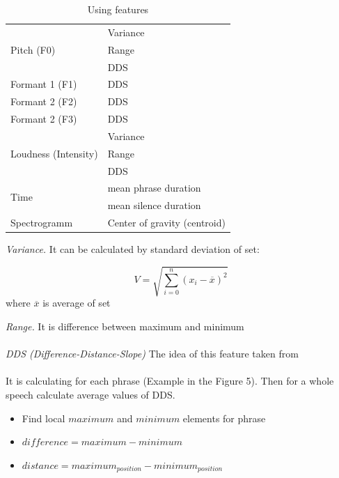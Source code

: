\documentclass[14pt]{extarticle}
\begin{document}
\begin{table}

\begin{tabular}{|p{2.2in}|p{2.2in}|} 
\hline
\multirow{3}{*}{Pitch (F0) }& Variance \\ \cline{2-2}
													& Range \\ \cline{2-2} 
													& DDS \\ \hline 
Formant 1 (F1) & DDS \\ \hline 
Formant 2 (F2) & DDS \\ \hline 
Formant 2 (F3) & DDS \\ \hline 
\multirow{3}{*}{Loudness (Intensity) } & Variance \\ \cline{2-2}
																		& Range \\ \cline{2-2}
																		& DDS \\ \hline 
\multirow{2}{*}{Time} & mean phrase duration \\ \cline{2-2} 
 & mean silence duration \\ \hline 
Spectrogramm & Center of gravity (centroid) \\ \hline 
\end{tabular}
	\caption{Using features}
	\label{Using features}
\end{table}
\emph{Variance.} It can be calculated by standard deviation of set:
\begin{center}
\[V=\sqrt{
\sum_{i=0}^{n}{
               (x_i-\overline{x})^2
               }
}
\]
 where  $\overline{x}$ is average of set\\
\end{center}
\emph{Range.} It is difference between maximum and minimum
\\\\
\emph{DDS (Difference-Distance-Slope)} The idea of this feature taken from\\ \cite["Real-time automatic emotion recognition
from speech"]{brittaelizabet}\\ It is calculating for each phrase (Example in the Figure 5). Then for a whole speech calculate average values of DDS.
\begin{itemize}
	\item Find local $maximum$ and $minimum$ elements for phrase
	\item $difference=maximum-minimum$
	\item $distance=maximum_{position}-minimum_{position}$
\end{itemize}
\end{document}

